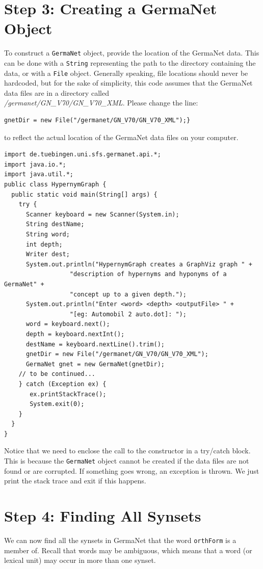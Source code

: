 \documentclass[12pt,a4paper,english,utf8]{report}
\begin{document}
\section{Step 3: Creating a GermaNet Object}
To construct a \texttt{GermaNet} object, provide the location of the GermaNet data. This can be done with a \texttt{String} representing the path to the directory containing the data, or with a \texttt{File} object. Generally speaking, file locations should never be hardcoded, but for the sake of simplicity, this code assumes that the GermaNet data files are in a directory called \\ \emph{/germanet/GN\_V70/GN\_V70\_XML}. Please change the line:

\begin{lstlisting}
gnetDir = new File("/germanet/GN_V70/GN_V70_XML");}
\end{lstlisting}

to reflect the actual location of the GermaNet data files on your computer.

\begin{lstlisting}
import de.tuebingen.uni.sfs.germanet.api.*;
import java.io.*;
import java.util.*;
public class HypernymGraph {
  public static void main(String[] args) {
    try {
      Scanner keyboard = new Scanner(System.in);
      String destName;
      String word;
      int depth;
      Writer dest;
      System.out.println("HypernymGraph creates a GraphViz graph " +
                  "description of hypernyms and hyponyms of a GermaNet" +
                  "concept up to a given depth.");
      System.out.println("Enter <word> <depth> <outputFile> " +
                  "[eg: Automobil 2 auto.dot]: ");
      word = keyboard.next();
      depth = keyboard.nextInt();
      destName = keyboard.nextLine().trim();
      gnetDir = new File("/germanet/GN_V70/GN_V70_XML");
      GermaNet gnet = new GermaNet(gnetDir);
	// to be continued...
    } catch (Exception ex) {
       ex.printStackTrace();
       System.exit(0);
    }
  }
}
\end{lstlisting}

Notice that we need to enclose the call to the constructor in a try/catch block. This is because the \texttt{GermaNet} object cannot be created if the data files are not found or are corrupted. If something goes wrong, an exception is thrown. We just print the stack trace and exit if this happens.



\section{Step 4: Finding All Synsets}
We can now find all the synsets in GermaNet that the word \texttt{orthForm} is a member of. Recall that words may be ambiguous, which means that a word (or lexical unit) may occur in more than one synset.
\end{document}
